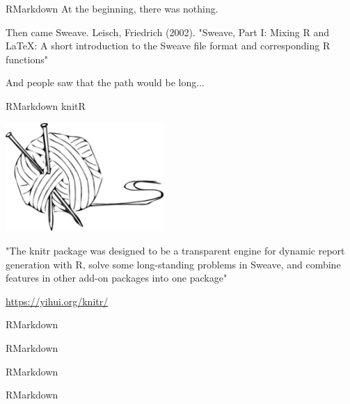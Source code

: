 \begin{frame}{RMarkdown}
At the beginning, there was nothing. \newline \pause

Then came Sweave.\newline
Leisch, Friedrich (2002). "Sweave, Part I: Mixing R and LaTeX: A short introduction to the Sweave file format and corresponding R functions" \pause

And people saw that the path would be long...
\end{frame}

\begin{frame}{RMarkdown}
knitR

\begin{center}
    \includegraphics[width=6cm]{07_notebook/images/knitr_logo.png}
\end{center}

"The knitr package was designed to be a transparent engine for dynamic report generation with R, solve some long-standing problems in Sweave, and combine features in other add-on packages into one package"

\url{https://yihui.org/knitr/}

\end{frame}

\begin{frame}{RMarkdown}
\end{frame}

\begin{frame}{RMarkdown}
\end{frame}

\begin{frame}{RMarkdown}
\end{frame}

\begin{frame}{RMarkdown}
\end{frame}

